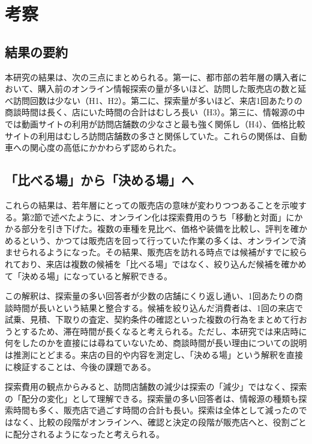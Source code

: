 \section{考察}

\subsection{結果の要約}

本研究の結果は、次の三点にまとめられる。第一に、都市部の若年層の購入者において、購入前のオンライン情報探索の量が多いほど、訪問した販売店の数と延べ訪問回数は少ない（H1、H2）。第二に、探索量が多いほど、来店1回あたりの商談時間は長く、店にいた時間の合計はむしろ長い（H3）。第三に、情報源の中では動画サイトの利用が訪問店舗数の少なさと最も強く関係し（H4）、価格比較サイトの利用はむしろ訪問店舗数の多さと関係していた。これらの関係は、自動車への関心度の高低にかかわらず認められた。

\subsection{「比べる場」から「決める場」へ}

これらの結果は、若年層にとっての販売店の意味が変わりつつあることを示唆する。第2節で述べたように、オンライン化は探索費用のうち「移動と対面」にかかる部分を引き下げた。複数の車種を見比べ、価格や装備を比較し、評判を確かめるという、かつては販売店を回って行っていた作業の多くは、オンラインで済ませられるようになった。その結果、販売店を訪れる時点では候補がすでに絞られており、来店は複数の候補を「比べる場」ではなく、絞り込んだ候補を確かめて「決める場」になっていると解釈できる。

この解釈は、探索量の多い回答者が少数の店舗にくり返し通い、1回あたりの商談時間が長いという結果と整合する。候補を絞り込んだ消費者は、1回の来店で試乗、見積、下取りの査定、契約条件の確認といった複数の行為をまとめて行おうとするため、滞在時間が長くなると考えられる。ただし、本研究では来店時に何をしたのかを直接には尋ねていないため、商談時間が長い理由についての説明は推測にとどまる。来店の目的や内容を測定し、「決める場」という解釈を直接に検証することは、今後の課題である。

探索費用の観点からみると、訪問店舗数の減少は探索の「減少」ではなく、探索の「配分の変化」として理解できる。探索量の多い回答者は、情報源の種類も探索時間も多く、販売店で過ごす時間の合計も長い。探索は全体として減ったのではなく、比較の段階がオンラインへ、確認と決定の段階が販売店へと、役割ごとに配分されるようになったと考えられる。

